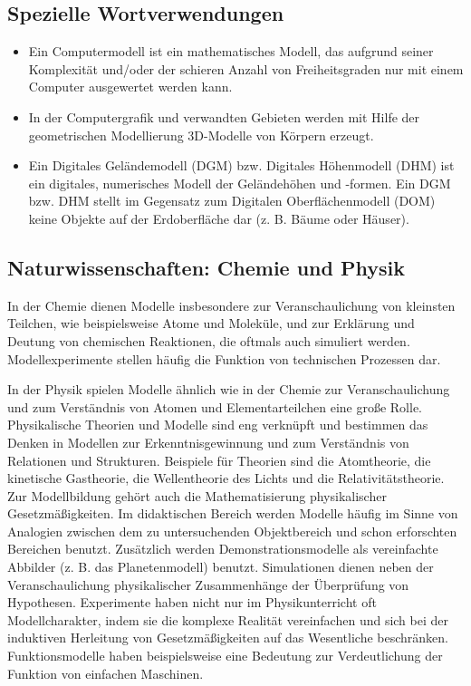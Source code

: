 \documentclass[a4paper, 12pt, pagesize]{scrartcl}
\begin{document}
\subsection*{Spezielle Wortverwendungen}
\begin{itemize}
    \item Ein Computermodell ist ein mathematisches Modell, das aufgrund seiner Komplexität und/oder der schieren Anzahl von Freiheitsgraden nur mit einem Computer ausgewertet werden kann.
    \item In der Computergrafik und verwandten Gebieten werden mit Hilfe der geometrischen Modellierung 3D-Modelle von Körpern erzeugt.
    \item Ein Digitales Geländemodell (DGM) bzw. Digitales Höhenmodell (DHM) ist ein digitales, numerisches Modell der Geländehöhen und -formen. Ein DGM bzw. DHM stellt im Gegensatz zum Digitalen Oberflächenmodell (DOM) keine Objekte auf der Erdoberfläche dar (z. B. Bäume oder Häuser).
\end{itemize}

\subsection{Naturwissenschaften: Chemie und Physik}
In der Chemie dienen Modelle insbesondere zur Veranschaulichung von kleinsten Teilchen, wie beispielsweise Atome und Moleküle, und zur Erklärung und Deutung von chemischen Reaktionen, die oftmals auch simuliert werden. Modellexperimente stellen häufig die Funktion von technischen Prozessen dar.

In der Physik spielen Modelle ähnlich wie in der Chemie zur Veranschaulichung und zum Verständnis von Atomen und Elementarteilchen eine große Rolle. Physikalische Theorien und Modelle sind eng verknüpft und bestimmen das Denken in Modellen zur Erkenntnisgewinnung und zum Verständnis von Relationen und Strukturen. Beispiele für Theorien sind die Atomtheorie, die kinetische Gastheorie, die Wellentheorie des Lichts und die Relativitätstheorie. Zur Modellbildung gehört auch die Mathematisierung physikalischer Gesetzmäßigkeiten. Im didaktischen Bereich werden Modelle häufig im Sinne von Analogien zwischen dem zu untersuchenden Objektbereich und schon erforschten Bereichen benutzt. Zusätzlich werden Demonstrationsmodelle als vereinfachte Abbilder (z. B. das Planetenmodell) benutzt. Simulationen dienen neben der Veranschaulichung physikalischer Zusammenhänge der Überprüfung von Hypothesen. Experimente haben nicht nur im Physikunterricht oft Modellcharakter, indem sie die komplexe Realität vereinfachen und sich bei der induktiven Herleitung von Gesetzmäßigkeiten auf das Wesentliche beschränken. Funktionsmodelle haben beispielsweise eine Bedeutung zur Verdeutlichung der Funktion von einfachen Maschinen.
\end{document}
